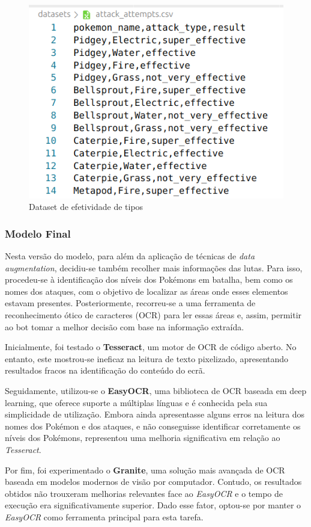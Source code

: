 \begin{figure}[h]
    \centering
    \includegraphics[width=0.5\linewidth]{imagens/dataset_ataques.png}
    \caption{Dataset de efetividade de tipos}
    \label{fig:phg_segundo_modelo}
\end{figure}

\subsubsection{Modelo Final}
Nesta versão do modelo, para além da aplicação de técnicas de \textit{data augmentation}, decidiu-se também recolher mais informações das lutas. Para isso, procedeu-se à identificação dos níveis dos Pokémons em batalha, bem como os nomes dos ataques, com o objetivo de localizar as áreas onde esses elementos estavam presentes. Posteriormente, recorreu-se a uma ferramenta de reconhecimento ótico de caracteres (OCR) para ler essas áreas e, assim, permitir ao bot tomar a melhor decisão com base na informação extraída.

Inicialmente, foi testado o \textbf{Tesseract}, um motor de OCR de código aberto. No entanto, este mostrou-se ineficaz na leitura de texto pixelizado, apresentando resultados fracos na identificação do conteúdo do ecrã.

Seguidamente, utilizou-se o \textbf{EasyOCR}, uma biblioteca de OCR baseada em deep learning, que oferece suporte a múltiplas línguas e é conhecida pela sua simplicidade de utilização. Embora ainda apresentasse alguns erros na leitura dos nomes dos Pokémon e dos ataques, e não conseguisse identificar corretamente os níveis dos Pokémons, representou uma melhoria significativa em relação ao \textit{Tesseract}.

Por fim, foi experimentado o \textbf{Granite}, uma solução mais avançada de OCR baseada em modelos modernos de visão por computador. Contudo, os resultados obtidos não trouxeram melhorias relevantes face ao \textit{EasyOCR} e o tempo de execução era significativamente superior. Dado esse fator, optou-se por manter o \textit{EasyOCR} como ferramenta principal para esta tarefa.

